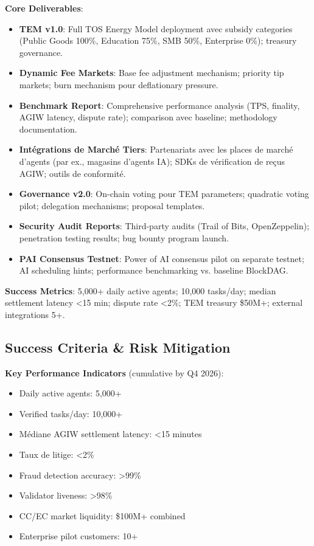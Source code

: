 \documentclass[11pt]{article}
\begin{document}
\textbf{Core Deliverables}:
\begin{itemize}[noitemsep]
  \item \textbf{TEM v1.0}: Full TOS Energy Model deployment avec subsidy categories (Public Goods 100\%, Education 75\%, SMB 50\%, Enterprise 0\%); treasury governance.
  \item \textbf{Dynamic Fee Markets}: Base fee adjustment mechanism; priority tip markets; burn mechanism pour deflationary pressure.
  \item \textbf{Benchmark Report}: Comprehensive performance analysis (TPS, finality, AGIW latency, dispute rate); comparison avec baseline; methodology documentation.
  \item \textbf{Intégrations de Marché Tiers}: Partenariats avec les places de marché d'agents (par ex., magasins d'agents IA); SDKs de vérification de reçus AGIW; outils de conformité.
  \item \textbf{Governance v2.0}: On-chain voting pour TEM parameters; quadratic voting pilot; delegation mechanisms; proposal templates.
  \item \textbf{Security Audit Reports}: Third-party audits (Trail of Bits, OpenZeppelin); penetration testing results; bug bounty program launch.
  \item \textbf{PAI Consensus Testnet}: Power of AI consensus pilot on separate testnet; AI scheduling hints; performance benchmarking vs. baseline BlockDAG.
\end{itemize}

\textbf{Success Metrics}: 5,000+ daily active agents; 10,000 tasks/day; median settlement latency <15 min; dispute rate <2\%; TEM treasury \$50M+; external integrations 5+.

\subsection{Success Criteria \& Risk Mitigation}

\textbf{Key Performance Indicators} (cumulative by Q4 2026):
\begin{itemize}[noitemsep]
  \item Daily active agents: 5,000+
  \item Verified tasks/day: 10,000+
  \item Médiane AGIW settlement latency: <15 minutes
  \item Taux de litige: <2\%
  \item Fraud detection accuracy: >99\%
  \item Validator liveness: >98\%
  \item CC/EC market liquidity: \$100M+ combined
  \item Enterprise pilot customers: 10+
\end{itemize}
\end{document}
